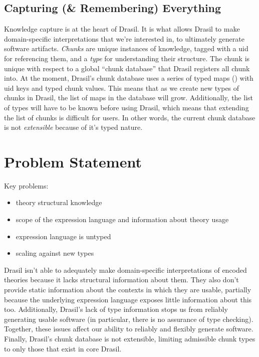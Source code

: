 \subsection{Capturing (\& Remembering) Everything}
\label{chap:intro:sec:drasil:subsec:capturing-and-remembering-everything}

Knowledge capture is at the heart of Drasil. It is what allows Drasil to make
domain-specific interpretations that we're interested in, to ultimately generate
software artifacts. \textit{Chunks} are unique instances of knowledge, tagged
with a \acs{uid} for referencing them, and a \textit{type} for understanding
their structure. The chunk is unique with respect to a global ``chunk database''
that Drasil registers all chunk into. At the moment, Drasil's chunk database
uses a series of typed maps () with \acs{uid} keys
and typed chunk values. This means that as we create new types of chunks in
Drasil, the list of maps in the database will grow. Additionally, the list of
types will have to be known before using Drasil, which means that extending the
list of chunks is difficult for users. In other words, the current chunk
database is not \textit{extensible} because of it's typed nature.

\section{Problem Statement}
\label{chap:intro:sec:problem-statement}

\begin{writingdirectives}
      \item Key problems:
      \begin{itemize}
            \item theory structural knowledge
            \item scope of the expression language and information about theory usage
            \item expression language is untyped
            \item scaling against new types
      \end{itemize}
\end{writingdirectives}

Drasil isn't able to adequately make domain-specific interpretations of encoded
theories because it lacks structural information about them. They also don't
provide static information about the contexts in which they are usable,
partially because the underlying expression language exposes little information
about this too. Additionally, Drasil's lack of type information stops us from
reliably generating usable software (in particular, there is no assurance of
type checking). Together, these issues affect our ability to reliably and
flexibly generate software. Finally, Drasil's chunk database is not extensible,
limiting admissible chunk types to only those that exist in core Drasil.\\

